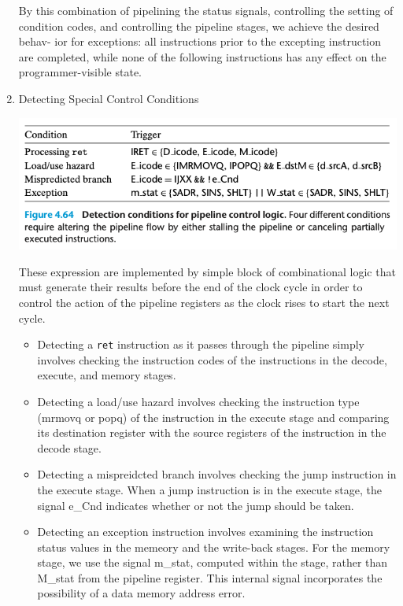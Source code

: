 \documentclass[11pt]{article}
\begin{document}
\begin{enumerate}
By this combination of pipelining the status signals, controlling the setting of condition codes, and controlling the pipeline stages, we achieve the desired behav- ior for exceptions: all instructions prior to the excepting instruction are completed, while none of the following instructions has any effect on the programmer-visible state.\\

\item Detecting Special Control Conditions
\label{sec:org6a8955b}

\begin{center}
\includegraphics[width=.9\linewidth]{pics/figure4.64-detection-condition-for-pipeline-control-logic.png}
\end{center}

These expression are implemented by simple block of combinational logic that must generate their results before the end of the clock cycle in order to control the action of the pipeline registers as the clock rises to start the next cycle.\\
\begin{itemize}
\item Detecting a \texttt{ret} instruction as it passes through the pipeline simply involves checking the instruction codes of the instructions in the decode, execute, and memory stages.\\
\item Detecting a load/use hazard involves checking the instruction type (mrmovq or popq) of the instruction in the execute stage and comparing its destination register with the source registers of the instruction in the decode stage.\\
\item Detecting a mispreidcted branch involves checking the jump instruction in the execute stage. When a jump instruction is in the execute stage, the signal e\_Cnd indicates whether or not the jump should be taken.\\
\item Detecting an exception instruction involves examining the instruction status values in the memeory and the write-back stages. For the memory stage, we use the signal m\_stat, computed within the stage, rather than M\_stat from the pipeline register. This internal signal incorporates the possibility of a data memory address error.\\
\end{itemize}



\end{enumerate}
\end{document}
